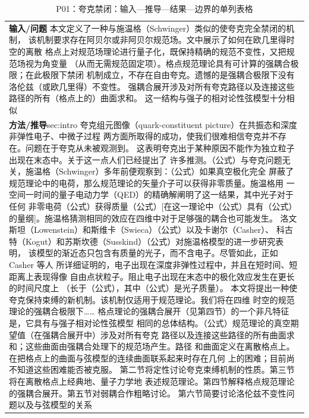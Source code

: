 \documentclass[UTF8,11pt,oneside]{ctexbook}
\begin{document}
\begin{table}[htbp]
  \centering
  \caption*{P01：夸克禁闭：输入—推导—结果—边界的单列表格}
  \small
  \begin{tabular}{@{}p{}@{}}
    \toprule
    \textbf{输入/问题}\quad 0.86 本文定义了一种与施温格（Schwinger）类似的使夸克完全禁闭的机制， 该机制要求存在阿贝尔或非阿贝尔规范场。文中展示了如何在欧几里得时空的离散 格点上对规范场理论进行量子化，既保持精确的规范不变性，又把规范场视为角变量 （从而无需规范固定项）。格点规范理论具有可计算的强耦合极限；在此极限下禁闭 机制成立，不存在自由夸克。遗憾的是强耦合极限下没有洛伦兹（或欧几里得）不变性。 强耦合展开涉及对所有夸克路径以及连接这些路径的所有（格点上的）曲面求和。 这一结构与强子的相对论性弦模型十分相似 \\
    \textbf{方法/推导}\quad sec:intro 夸克组元图像（quark-constituent picture）在共振态和深度非弹性电子、中微子过程 两方面所取得的成功，使我们很难相信夸克并不存在。问题在于夸克从未被观测到。 这表明夸克出于某种原因不能作为独立粒子出现在末态中。关于这一点人们已经提出了 许多推测。（公式）与夸克问题无关，施温格（Schwinger）多年前便观察到：（公式）如果真空极化完全 屏蔽了规范理论中的电荷，那么规范理论的矢量介子可以获得非零质量。施温格用 一空间一时间的量子电动力学（QED）的精确解阐明了这一结果，其中光子对于任何 非零电荷（公式）获得质量（公式）[在这一理论中（公式）具有（公式）的量纲]。施温格猜测相同的效应在四维中对于足够强的耦合也可能发生。 洛文斯坦（Lowenstein）和斯维卡（Swieca）（公式）以及卡谢尔（Casher）、 科古特（Kogut）和苏斯坎德（Susskind）（公式）对施温格模型的进一步研究表明， 该模型的渐近态只包含有质量的光子，而不含电子。尽管如此，正如 Casher 等人 所详细证明的，电子出现在深度非弹性过程中，并且在短时间、短距离上表现得像 自由点状粒子。阻止电子出现在末态中的极化效应发生在更长的时间尺度上 （长于（公式），其中（公式）是光子质量）。 本文将提出一种使夸克保持束缚的新机制。该机制仅适用于规范理论。我们将在四维 时空的规范理论的强耦合极限下…… 格点理论的强耦合展开（见第四节）的一个非凡特征是，它具有与强子相对论性弦模型 相同的总体结构。（公式）规范理论的真空期望值（在强耦合展开中）涉及对所有夸克 路径以及连接这些路径的所有曲面求和；这些曲面由强耦合处理下的规范场产生。路径 和曲面定义在离散格点上。在把格点上的曲面与弦模型的连续曲面联系起来时存在几何 上的困难；目前尚不知道这些困难能否被克服。 第二节将定性讨论夸克束缚机制的性质。第三节将在离散格点上经典地、量子力学地 表述规范理论。第四节解释格点规范理论的强耦合展开。第五节对弱耦合作粗略讨论。 第六节简要讨论洛伦兹不变性问题以及与弦模型的关系 \\

\end{tabular}
\end{table}
\end{document}
